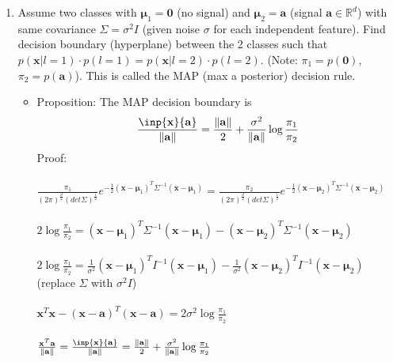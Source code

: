 \documentclass[11pt]{article}
\newcommand{\R}{\mathbb{R}}
\newcommand{\norm}[1]{\left\lVert#1\right\rVert}
\begin{document}
\begin{enumerate}
    \item Assume two classes with $\mathbf{\mu}_1 = \mathbf{0}$ (no signal) and $\mathbf{\mu}_2 = \mathbf{a}$ (signal $\mathbf{a} \in \R^d$) with same covariance $\Sigma = \sigma^2 I$ (given noise $\sigma$ for each independent feature). Find decision boundary (hyperplane) between the 2 classes such that $p(\mathbf{x}|l=1)\cdot p(l=1) = p(\mathbf{x}|l=2)\cdot p(l=2)$. (Note: $\pi_1 = p(\mathbf{0})$, $\pi_2 = p(\mathbf{a})$).
    This is called the MAP (max a posterior) decision rule. 
    \begin{itemize}
    \item Proposition: The MAP decision boundary is 
    \begin{equation}
         \frac{\inp {\mathbf{x}}{\mathbf{a}}}{\norm {\mathbf{a}}} = \frac{\norm {\mathbf{a}}}{2} + \frac{\sigma^2}{\norm {\mathbf{a}}}\log{\frac{\pi_1}{\pi_2}}
    \end{equation}
    Proof: \\\\
    $\frac{\pi_1}{{(2\pi)}^{\frac{d}{2}} {(det\Sigma)}^{\frac{1}{2}}} e^{-\frac{1}{2}{(\mathbf{x}-\mathbf{\mu}_1)}^T \Sigma^{-1}{(\mathbf{x}-\mathbf{\mu}_1)}} = \frac{\pi_2}{{(2\pi)}^{\frac{d}{2}} {(det\Sigma)}^{\frac{1}{2}}} e^{-\frac{1}{2}{(\mathbf{x}-\mathbf{\mu}_2)}^T \Sigma^{-1}{(\mathbf{x}-\mathbf{\mu}_2)}}$ \\\\
    $2\log{\frac{\pi_1}{\pi_2}} = {(\mathbf{x}-\mathbf{\mu}_1)}^T \Sigma^{-1}{(\mathbf{x}-\mathbf{\mu}_1)} - {(\mathbf{x}-\mathbf{\mu}_2)}^T \Sigma^{-1}{(\mathbf{x}-\mathbf{\mu}_2)}$\\\\
    $2\log{\frac{\pi_1}{\pi_2}} = \frac{1}{\sigma^2}{(\mathbf{x}-\mathbf{\mu}_1)}^T I^{-1}{(\mathbf{x}-\mathbf{\mu}_1)} - \frac{1}{\sigma^2}{(\mathbf{x}-\mathbf{\mu}_2)}^T I^{-1}{(\mathbf{x}-\mathbf{\mu}_2)}$ (replace $\Sigma$ with $\sigma^2 I$)\\\\
    $\mathbf{x}^T\mathbf{x} - {(\mathbf{x}-\mathbf{a})}^T(\mathbf{x}-\mathbf{a}) = 2\sigma^2\log{\frac{\pi_1}{\pi_2}}$\\\\
    $\frac{\mathbf{x}^T\mathbf{a}}{\norm {\mathbf{a} }} = \frac{\inp {\mathbf{x}} {\mathbf{a}}}{\norm {\mathbf{a} }} = \frac{\norm {\mathbf{a} }}{2} + \frac{\sigma^2}{\norm {\mathbf{a} }}\log{\frac{\pi_1}{\pi_2}}$
    

\end{itemize}
\end{enumerate}
\end{document}
